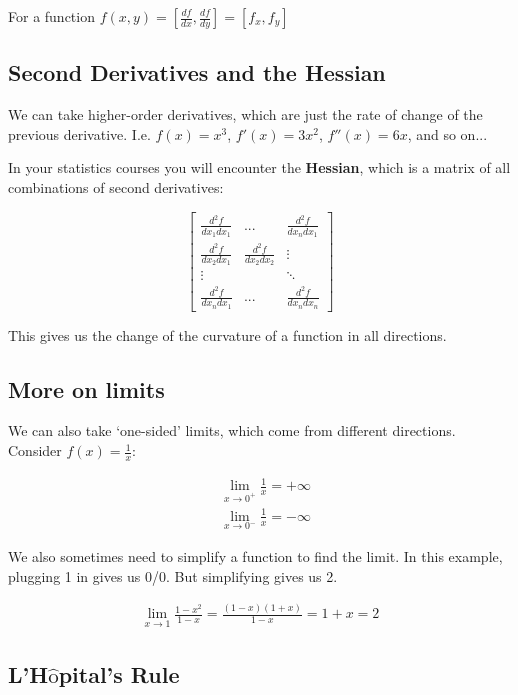\noindent For a function $f(x,y) = \left[\frac{df}{dx}, \frac{df}{dy}\right] = [f_x, f_y]$

\subsection{Second Derivatives and the Hessian}

We can take higher-order derivatives, which are just the rate of change of the previous derivative. I.e. $f(x) = x^3$, $f'(x) = 3x^2$, $f''(x) = 6x$, and so on... 

\noindent In your statistics courses you will encounter the \textbf{Hessian}, which is a matrix of all combinations of second derivatives:

\begin{equation*}
    \begin{bmatrix}
        \frac{d^2f}{dx_1 dx_1} & ... & \frac{d^2f}{dx_n dx_1} \\
        \frac{d^2f}{dx_2 dx_1} & \frac{d^2f}{dx_2 dx_2} & \vdots \\
        \vdots & & \ddots \\
        \frac{d^2f}{dx_n dx_1} & ... & \frac{d^2f}{dx_n dx_n}
    \end{bmatrix}
\end{equation*}

\noindent This gives us the change of the curvature of a function in all directions. 

\subsection{More on limits}

We can also take `one-sided' limits, which come from different directions. Consider $f(x) = \frac{1}{x}$:

\begin{align*}
    & \lim_{x \rightarrow 0^+} \frac{1}{x} = +\infty \\
    & \lim_{x \rightarrow 0^-} \frac{1}{x} = -\infty
\end{align*}

We also sometimes need to simplify a function to find the limit. In this example, plugging 1 in gives us 0/0. But simplifying gives us 2.

\begin{align*}
    \lim_{x \rightarrow 1} \frac{1 - x^2}{1-x} = \frac{(1-x)(1+x)}{1-x} = 1 + x = 2 
\end{align*}

\subsection{L'H$\hat{\text{o}}$pital's Rule}

